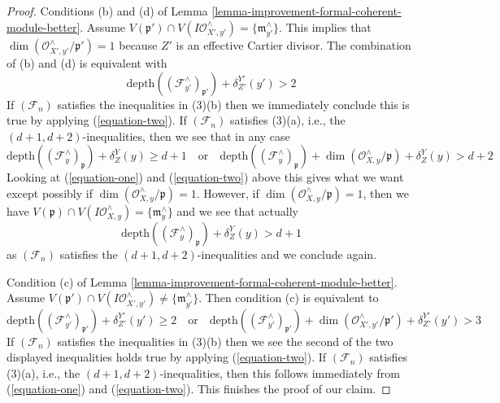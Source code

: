 \documentclass[10pt,a4paper]{amsart}
\theoremstyle{plain}
\theoremstyle{definition}
\theoremstyle{remark}
\numberwithin{equation}{subsection}
\begin{document}
\begin{proof}
\medskip\noindent
Conditions (b) and (d) of
Lemma \ref{lemma-improvement-formal-coherent-module-better}. Assume
$V(\mathfrak p') \cap V(I\mathcal{O}_{X', y'}^\wedge) =
\{\mathfrak m_{y'}^\wedge\}$.
This implies that $\dim(\mathcal{O}_{X', y'}^\wedge/\mathfrak p') = 1$
because $Z'$ is an effective Cartier divisor.
The combination of (b) and (d) is equivalent with
$$
\text{depth}((\mathcal{F}_{y'}^\wedge)_{\mathfrak p'}) + \delta^{Y'}_{Z'}(y')
> 2
$$
If $(\mathcal{F}_n)$ satisfies the inequalities in (3)(b)
then we immediately conclude this is true by applying (\ref{equation-two}).
If $(\mathcal{F}_n)$ satisfies (3)(a), i.e., the
$(d + 1, d + 2)$-inequalities, then we see that in any case
$$
\text{depth}((\mathcal{F}_y^\wedge)_{\mathfrak p}) + \delta^Y_Z(y)
\geq d + 1
\quad\text{or}\quad
\text{depth}((\mathcal{F}_y^\wedge)_{\mathfrak p}) +
\dim(\mathcal{O}_{X, y}^\wedge/\mathfrak p) +
\delta^Y_Z(y) > d + 2
$$
Looking at (\ref{equation-one}) and (\ref{equation-two}) above this gives
what we want except possibly if
$\dim(\mathcal{O}_{X, y}^\wedge/\mathfrak p) = 1$.
However, if $\dim(\mathcal{O}_{X, y}^\wedge/\mathfrak p) = 1$, then we have
$V(\mathfrak p) \cap V(I\mathcal{O}_{X, y}^\wedge) = \{\mathfrak m_y^\wedge\}$
and we see that actually
$$
\text{depth}((\mathcal{F}_y^\wedge)_{\mathfrak p}) + \delta^Y_Z(y) > d + 1
$$
as $(\mathcal{F}_n)$ satisfies the $(d + 1, d + 2)$-inequalities and we
conclude again.

\medskip\noindent
Condition (c) of
Lemma \ref{lemma-improvement-formal-coherent-module-better}. Assume
$V(\mathfrak p') \cap V(I\mathcal{O}_{X', y'}^\wedge) \not =
\{\mathfrak m_{y'}^\wedge\}$. Then condition (c) is equivalent to
$$
\text{depth}((\mathcal{F}_{y'}^\wedge)_{\mathfrak p'}) + \delta^{Y'}_{Z'}(y')
\geq 2
\quad\text{or}\quad
\text{depth}((\mathcal{F}_{y'}^\wedge)_{\mathfrak p'}) +
\dim(\mathcal{O}_{X', y'}^\wedge/\mathfrak p') +
\delta^{Y'}_{Z'}(y') > 3
$$
If $(\mathcal{F}_n)$ satisfies the inequalities in (3)(b)
then we see the second of the two displayed inequalities holds true
by applying (\ref{equation-two}). If $(\mathcal{F}_n)$ satisfies (3)(a), i.e.,
the $(d + 1, d + 2)$-inequalities, then this follows immediately from
(\ref{equation-one}) and (\ref{equation-two}).
This finishes the proof of our claim.


\end{proof}
\end{document}
